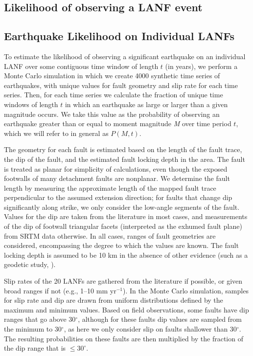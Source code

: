 \documentclass[twocolumn,grl]{AGUTeX}
\begin{document}
\begin{article}
\section{Likelihood of observing a LANF event}
\subsection{Earthquake Likelihood on Individual LANFs}
To estimate the likelihood of observing a significant earthquake on an
individual LANF over some contiguous time window of length $t$ (in
years), we perform a Monte Carlo simulation in which we create 4000
synthetic time series of earthquakes, with unique values for fault
geometry and slip rate for each time series. Then, for each time
series we calculate the fraction of unique time windows of length $t$
in which an earthquake as large or larger than a given magnitude
occurs.  We take this value as the probability of observing an
earthquake greater than or equal to moment magnitude \emph{M} over
time period $t$, which we will refer to in general as $P(M,t)$.

The geometry for each fault is estimated based on the length of the
fault trace, the dip of the fault, and the estimated fault locking depth 
in the area.  The fault is treated as
planar for simplicity of calculations, even though the exposed
footwalls of many detachment faults are nonplanar.  We
determine the fault length by measuring the approximate length of the
mapped fault trace perpendicular to the assumed extension direction;
for faults that change dip significantly along strike, we only consider 
the low-angle segments of the fault.
Values for the dip are taken from the literature in most cases, and
measurements of the dip of footwall triangular facets (interpreted as the 
exhumed fault plane) from SRTM data otherwise. In all cases, ranges of fault
geometries are considered, encompassing the degree to which the values are 
known. The fault locking depth is assumed to be 10 km in the absence of other
evidence (such as a geodetic study, \citep[e.g.,][]{hreinsdottir2009altotib}).

Slip rates of the 20 LANFs are gathered from the
literature if possible, or given broad ranges if not 
(e.g., 1--10 mm yr$^{-1}$).  In the Monte Carlo simulation, samples
for slip rate and dip are drawn from uniform distributions defined
by the maximum and minimum values.  Based on field observations,
some faults have dip ranges that go above 30$^\circ$, although for these faults
dip values are sampled from the minimum to 30$^\circ$, as here we
only consider slip on faults shallower than 30$^\circ$. The resulting
probabilities on these faults are then multiplied by the fraction of
the dip range that is $\le30^\circ$.


\end{article}
\end{document}
